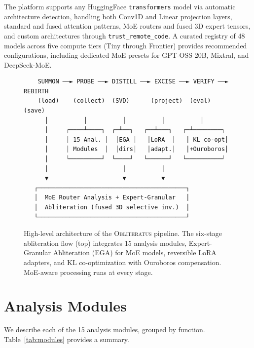 \documentclass[11pt]{article}
\begin{document}
The platform supports any HuggingFace \texttt{transformers} model via automatic architecture detection, handling both Conv1D and Linear projection layers, standard and fused attention patterns, MoE routers and fused 3D expert tensors, and custom architectures through \texttt{trust\_remote\_code}. A curated registry of 48 models across five compute tiers (Tiny through Frontier) provides recommended configurations, including dedicated MoE presets for GPT-OSS 20B, Mixtral, and DeepSeek-MoE.

\begin{figure}[t]
\centering
\small
\begin{verbatim}
    SUMMON ──► PROBE ──► DISTILL ──► EXCISE ──► VERIFY ──► REBIRTH
    (load)    (collect)  (SVD)      (project)  (eval)     (save)
      │          │          │          │          │
      │     ┌────┴────┐  ┌─┴──┐   ┌──┴───┐   ┌─┴────────┐
      │     │ 15 Anal. │  │EGA │   │LoRA  │   │ KL co-opt│
      │     │ Modules  │  │dirs│   │adapt.│   │+Ouroboros│
      │     └─────────┘  └────┘   └──────┘   └──────────┘
      │                     │          │
      ▼                     ▼          ▼
   ┌──────────────────────────────────────────┐
   │  MoE Router Analysis + Expert-Granular   │
   │  Abliteration (fused 3D selective inv.)  │
   └──────────────────────────────────────────┘
\end{verbatim}
\caption{High-level architecture of the \textsc{Obliteratus} pipeline. The six-stage abliteration flow (top) integrates 15 analysis modules, Expert-Granular Abliteration (EGA) for MoE models, reversible LoRA adapters, and KL co-optimization with Ouroboros compensation. MoE-aware processing runs at every stage.}
\label{fig:architecture}
\end{figure}

\section{Analysis Modules}
\label{sec:analysis}

We describe each of the 15 analysis modules, grouped by function. Table~\ref{tab:modules} provides a summary.
\end{document}

